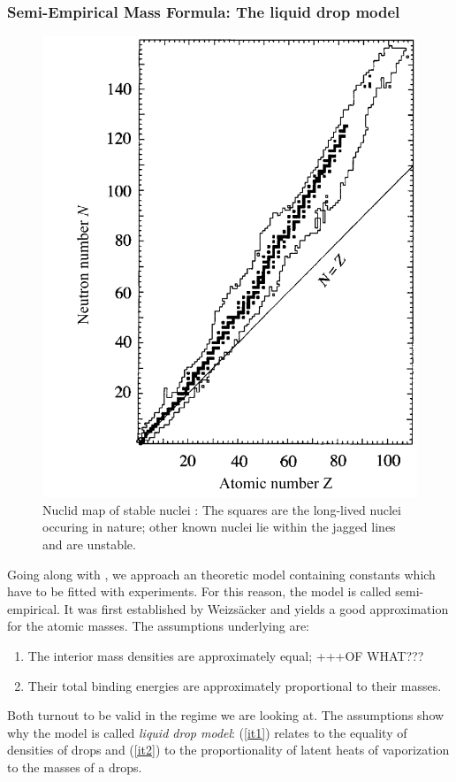 \subsubsection{Semi-Empirical Mass Formula: The liquid drop model}
\begin{figure}[htpb]
    \centering
    \includegraphics[width=0.6\linewidth]{figures/nuclidmap}
    \caption{Nuclid map of stable nuclei \cite{Hooshyar}: The squares are the long-lived nuclei
    occuring in nature; other known nuclei lie within the jagged lines and are unstable.}
    \label{fig:nuclidmap}
\end{figure}
\label{ssub:Semi-Empirical Mass Formula: The Liquid Drop Model}
Going along with  \cite{Hooshyar}, we approach an theoretic model containing constants which
have to be fitted with experiments. For this reason, the model is called semi-empirical. 
It was first established by Weizsäcker and yields a 
good approximation for the atomic masses. The assumptions underlying are:
\begin{enumerate}
    \item The interior mass densities are approximately equal; +++OF WHAT???
        \label{it1}
    \item Their total binding energies are approximately proportional to their masses.
        \label{it2}
\end{enumerate}
Both turnout to be valid in the regime we are looking at.
The assumptions show why the model is called \emph{liquid drop model}: (\ref{it1}) relates to the equality of densities
of drops and (\ref{it2}) to the proportionality of latent heats of vaporization to the masses of a drops. 

